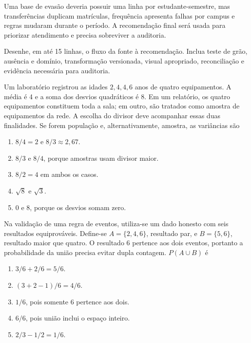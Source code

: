 \documentclass[12pt,a4paper]{article}
\begin{document}

\TextoBase

Uma base de evasão deveria possuir uma linha por estudante-semestre, mas transferências duplicam matrículas, frequência apresenta falhas por campus e regras mudaram durante o período. A recomendação final será usada para priorizar atendimento e precisa sobreviver a auditoria.

\FonteDidatica

\Comando Desenhe, em até 15 linhas, o fluxo da fonte à recomendação. Inclua teste de grão, ausência e domínio, transformação versionada, visual apropriado, reconciliação e evidência necessária para auditoria.
\EspacoDiscursiva

\TextoBase Um laboratório registrou as idades $2,4,4,6$ anos de quatro equipamentos. A média é 4 e a soma dos desvios quadráticos é 8. Em um relatório, os quatro equipamentos constituem toda a sala; em outro, são tratados como amostra de equipamentos da rede. A escolha do divisor deve acompanhar essas duas finalidades.
\FonteDidatica
\Comando Se forem população e, alternativamente, amostra, as variâncias são
\begin{enumerate}[label=\Alph*)]
  \item $8/4=2$ e $8/3\approx2{,}67$.
  \item $8/3$ e $8/4$, porque amostras usam divisor maior.
  \item $8/2=4$ em ambos os casos.
  \item $\sqrt8$ e $\sqrt3$.
  \item 0 e 8, porque os desvios somam zero.
\end{enumerate}

\TextoBase Na validação de uma regra de eventos, utiliza-se um dado honesto com seis resultados equiprováveis. Define-se $A=\{2,4,6\}$, resultado par, e $B=\{5,6\}$, resultado maior que quatro. O resultado 6 pertence aos dois eventos, portanto a probabilidade da união precisa evitar dupla contagem.
\FonteDidatica
\Comando $P(A\cup B)$ é
\begin{enumerate}[label=\Alph*)]
  \item $3/6+2/6=5/6$.
  \item $(3+2-1)/6=4/6$.
  \item $1/6$, pois somente 6 pertence aos dois.
  \item $6/6$, pois união inclui o espaço inteiro.
  \item $2/3-1/2=1/6$.
\end{enumerate}
\end{document}
